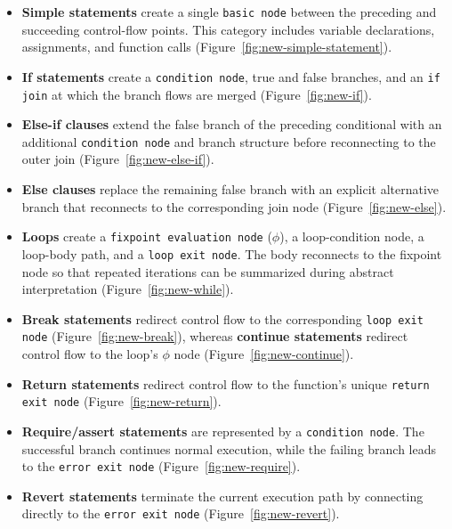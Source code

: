 \documentclass[11pt,oneside]{report}
\theoremstyle{plain}
\theoremstyle{definition}
\theoremstyle{remark}
\begin{document}
\begin{itemize}

  \item \textbf{Simple statements} create a single \texttt{basic node} between the preceding and succeeding control-flow points. This category includes variable declarations, assignments, and function calls (Figure~\ref{fig:new-simple-statement}).

  \item \textbf{If statements} create a \texttt{condition node}, true and false branches, and an \texttt{if join} at which the branch flows are merged (Figure~\ref{fig:new-if}).

  \item \textbf{Else-if clauses} extend the false branch of the preceding conditional with an additional \texttt{condition node} and branch structure before reconnecting to the outer join (Figure~\ref{fig:new-else-if}).

  \item \textbf{Else clauses} replace the remaining false branch with an explicit alternative branch that reconnects to the corresponding join node (Figure~\ref{fig:new-else}).

  \item \textbf{Loops} create a \texttt{fixpoint evaluation node} (\(\phi\)), a loop-condition node, a loop-body path, and a \texttt{loop exit node}. The body reconnects to the fixpoint node so that repeated iterations can be summarized during abstract interpretation (Figure~\ref{fig:new-while}).

  \item \textbf{Break statements} redirect control flow to the corresponding \texttt{loop exit node} (Figure~\ref{fig:new-break}), whereas \textbf{continue statements} redirect control flow to the loop's \(\phi\) node (Figure~\ref{fig:new-continue}).

  \item \textbf{Return statements} redirect control flow to the function's unique \texttt{return exit node} (Figure~\ref{fig:new-return}).

  \item \textbf{Require/assert statements} are represented by a \texttt{condition node}. The successful branch continues normal execution, while the failing branch leads to the \texttt{error exit node} (Figure~\ref{fig:new-require}).

  \item \textbf{Revert statements} terminate the current execution path by connecting directly to the \texttt{error exit node} (Figure~\ref{fig:new-revert}).

\end{itemize}
\end{document}
